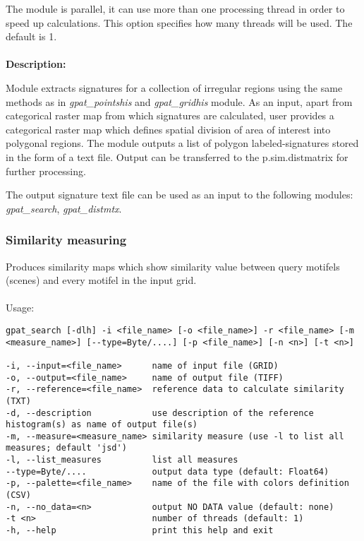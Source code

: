 
The module is parallel, it can use more than one processing thread in order to speed up calculations. This option specifies how many threads will be used. The default is 1.
\\\\
{\bf Description:}

Module extracts signatures for a collection of irregular regions using the same methods as in {\it gpat\_pointshis} and {\it gpat\_gridhis} module. As an input, apart from categorical raster map from which signatures are calculated, user provides a categorical raster map which defines spatial division of area of interest into polygonal regions. The module outputs a list of polygon labeled-signatures stored in the form of a text file. Output can be transferred to the p.sim.distmatrix for further processing.

The output signature text file can be used as an input to the following modules: {\it gpat\_search}, {\it gpat\_distmtx}.

\subsubsection{Similarity measuring}

Produces similarity maps which show similarity value between query motifels (scenes) and every motifel in the input grid.
\\\\
Usage:

\begin{minipage}{\linewidth}
\begin{lstlisting}
gpat_search [-dlh] -i <file_name> [-o <file_name>] -r <file_name> [-m <measure_name>] [--type=Byte/....] [-p <file_name>] [-n <n>] [-t <n>]

-i, --input=<file_name>      name of input file (GRID)
-o, --output=<file_name>     name of output file (TIFF)
-r, --reference=<file_name>  reference data to calculate similarity (TXT)
-d, --description            use description of the reference histogram(s) as name of output file(s)
-m, --measure=<measure_name> similarity measure (use -l to list all measures; default 'jsd')
-l, --list_measures          list all measures
--type=Byte/....             output data type (default: Float64)
-p, --palette=<file_name>    name of the file with colors definition (CSV)
-n, --no_data=<n>            output NO DATA value (default: none)
-t <n>                       number of threads (default: 1)
-h, --help                   print this help and exit
\end{lstlisting}
\end{minipage}


